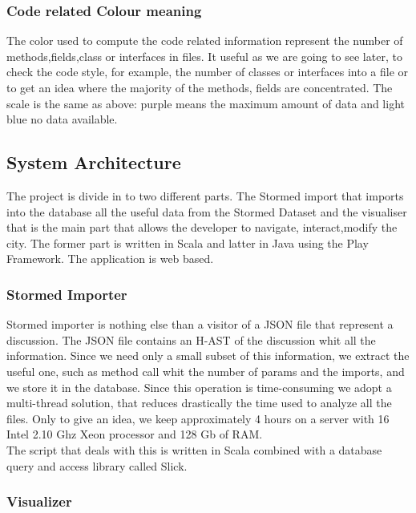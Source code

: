 \documentclass[]{usiinfbachelorproject}
\begin{document}
\subsubsection{Code related Colour meaning}

The color used to compute the code related information represent  the number of methods,fields,class or interfaces in files. It useful as we are going to see later, to check the code style, for example, the number of classes or interfaces into a file or to get an idea where the majority of the methods, fields are concentrated. The scale is the same as above: purple means the maximum amount of  data and light blue no data available. 


\newpage
\subsection{System Architecture }
The project is divide in to two different parts. The Stormed import that imports into the database all the useful data from the Stormed Dataset and the visualiser that is the main part  that allows the developer to navigate, interact,modify the city. The former part is written in Scala and latter in Java using the Play Framework. The application is web based. 




\subsubsection{Stormed Importer}
Stormed importer is nothing else than a visitor of a JSON file that represent a discussion. The JSON file contains an H-AST of the discussion whit all the information. Since we need only a small subset of this information, we extract the useful one, such as method call whit the number of params and the imports, and we store it in the database. Since this operation is time-consuming we adopt a multi-thread solution, that reduces drastically the time used to analyze all the files. Only to give an idea, we keep approximately 4 hours on a server with 16 Intel 2.10 Ghz Xeon processor and 128 Gb of RAM.\\
The script that deals with this is written in Scala combined with a database query and access library called Slick.


\subsubsection{Visualizer}
\end{document}
